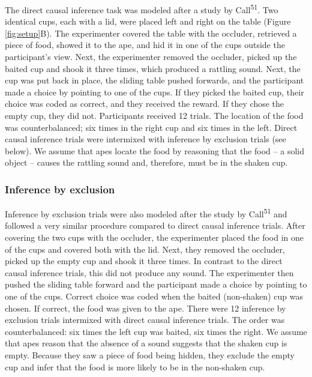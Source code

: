 \documentclass[
  man,floatsintext]{apa6}
\begin{document}
The direct causal inference task was modeled after a study by Call\textsuperscript{51}. Two identical cups, each with a lid, were placed left and right on the table (Figure \ref{fig:setup}B). The experimenter covered the table with the occluder, retrieved a piece of food, showed it to the ape, and hid it in one of the cups outside the participant's view. Next, the experimenter removed the occluder, picked up the baited cup and shook it three times, which produced a rattling sound. Next, the cup was put back in place, the sliding table pushed forwards, and the participant made a choice by pointing to one of the cups. If they picked the baited cup, their choice was coded as correct, and they received the reward. If they chose the empty cup, they did not. Participants received 12 trials. The location of the food was counterbalanced; six times in the right cup and six times in the left. Direct causal inference trials were intermixed with inference by exclusion trials (see below). We assume that apes locate the food by reasoning that the food -- a solid object -- causes the rattling sound and, therefore, must be in the shaken cup.

\hypertarget{inference-by-exclusion}{%
\subsubsection{Inference by exclusion}\label{inference-by-exclusion}}

Inference by exclusion trials were also modeled after the study by Call\textsuperscript{51} and followed a very similar procedure compared to direct causal inference trials. After covering the two cups with the occluder, the experimenter placed the food in one of the cups and covered both with the lid. Next, they removed the occluder, picked up the empty cup and shook it three times. In contrast to the direct causal inference trials, this did not produce any sound. The experimenter then pushed the sliding table forward and the participant made a choice by pointing to one of the cups. Correct choice was coded when the baited (non-shaken) cup was chosen. If correct, the food was given to the ape. There were 12 inference by exclusion trials intermixed with direct causal inference trials. The order was counterbalanced: six times the left cup was baited, six times the right. We assume that apes reason that the absence of a sound suggests that the shaken cup is empty. Because they saw a piece of food being hidden, they exclude the empty cup and infer that the food is more likely to be in the non-shaken cup.
\end{document}
